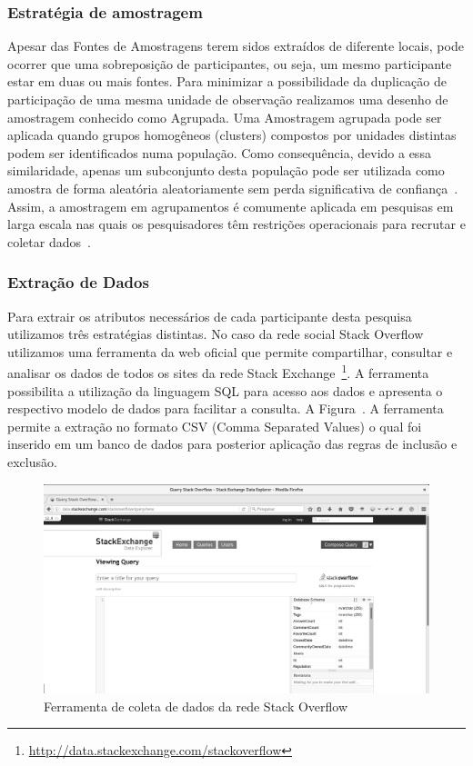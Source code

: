 \subsubsection{Estratégia de amostragem}

Apesar das Fontes de Amostragens terem sidos extraídos de diferente locais, pode
ocorrer que uma sobreposição de participantes, ou seja, um mesmo participante
estar em duas ou mais fontes. Para minimizar a possibilidade da duplicação de
participação de uma mesma unidade de observação realizamos uma  desenho de
amostragem conhecido como Agrupada. Uma Amostragem agrupada pode ser aplicada
quando grupos homogêneos (clusters) compostos por unidades distintas podem ser
identificados numa população. Como consequência, devido a essa similaridade,
apenas um subconjunto desta população pode ser utilizada como amostra de forma
aleatória aleatoriamente sem perda significativa de
confiança~\cite{thompson2012sampling}. Assim, a amostragem em  agrupamentos é
comumente aplicada em pesquisas em larga escala nas quais os pesquisadores têm
restrições operacionais para recrutar e coletar
dados~\cite{roberts2004mortality}.

\subsubsection{Extração de Dados}

Para extrair os atributos necessários de cada participante desta pesquisa
utilizamos três estratégias distintas. No caso da rede social Stack Overflow
utilizamos uma ferramenta da web oficial que permite compartilhar, consultar e
analisar os dados de todos os sites da rede Stack
Exchange~\footnote{\url{http://data.stackexchange.com/stackoverflow}}. A
ferramenta possibilita a utilização da linguagem SQL para acesso aos dados e
apresenta o respectivo modelo de dados para facilitar a consulta. A
Figura~\cite{fig:stack-exchange}. A ferramenta permite a extração no formato CSV
(Comma Separated Values) o qual foi inserido em um banco de dados para posterior
aplicação das regras de inclusão e exclusão.

\begin{figure}[htpb]
	\centering
	\includegraphics[width=0.8\linewidth]{./chapter-pesquisa-com-profissionais/img/stack-exchange.png}
	\caption{Ferramenta de coleta de dados da rede Stack Overflow}
\label{fig:stack-exchange}
\end{figure}

